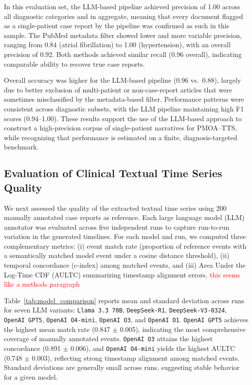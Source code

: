 \documentclass[pdflatex,sn-mathphys-num]{sn-jnl}%
\newcommand{\jeremy}[1]{\textcolor{red}{#1}}
\theoremstyle{thmstyleone}%
\theoremstyle{thmstyletwo}%
\theoremstyle{thmstylethree}%
\begin{document}
In this evaluation set, the LLM-based pipeline achieved precision of 1.00 across all diagnostic categories and in aggregate, meaning that every document flagged as a single-patient case report by the pipeline was confirmed as such in this sample. The PubMed metadata filter showed lower and more variable precision, ranging from 0.84 (atrial fibrillation) to 1.00 (hypertension), with an overall precision of 0.92. Both methods achieved similar recall (0.96 overall), indicating comparable ability to recover true case reports.

Overall accuracy was higher for the LLM-based pipeline (0.96 vs.\ 0.88), largely due to better exclusion of multi-patient or non-case-report articles that were sometimes misclassified by the metadata-based filter. Performance patterns were consistent across diagnostic subsets, with the LLM pipeline maintaining high F1 scores (0.94–1.00). These results support the use of the LLM-based approach to construct a high-precision corpus of single-patient narratives for PMOA--TTS, while recognizing that performance is estimated on a finite, diagnosis-targeted benchmark.

\subsection{Evaluation of Clinical Textual Time Series Quality}
\label{sec:evaluation-of-tts-quality}

We next assessed the quality of the extracted textual time series using 200 manually annotated case reports as reference. Each large language model (LLM) annotator was evaluated across five independent runs to capture run-to-run variation in the generated timelines. For each model and run, we computed three complementary metrics: (i) event match rate (proportion of reference events with a semantically matched model event under a cosine distance threshold), (ii) temporal concordance (c-index) among matched events, and (iii) Area Under the Log-Time CDF (AULTC) summarizing timestamp alignment errors. \jeremy{this seems like a methods paragraph}

Table~\ref{tab:model_comparison} reports mean and standard deviation across runs for seven LLM variants: \texttt{Llama 3.3 70B}, \texttt{DeepSeek-R1}, \texttt{DeepSeek-V3-0324}, \texttt{OpenAI GPT5}, \texttt{OpenAI O4-mini}, \texttt{OpenAI O3}, and \texttt{OpenAI O1}. \texttt{OpenAI GPT5} achieves the highest mean match rate (0.847 $\pm$ 0.005), indicating the most comprehensive coverage of manually annotated events. \texttt{OpenAI O3} attains the highest concordance (0.891 $\pm$ 0.006), and \texttt{OpenAI O4-mini} yields the highest AULTC (0.748 $\pm$ 0.003), reflecting strong timestamp alignment among matched events. Standard deviations are generally small across runs, suggesting stable behavior for a given model.
\end{document}
